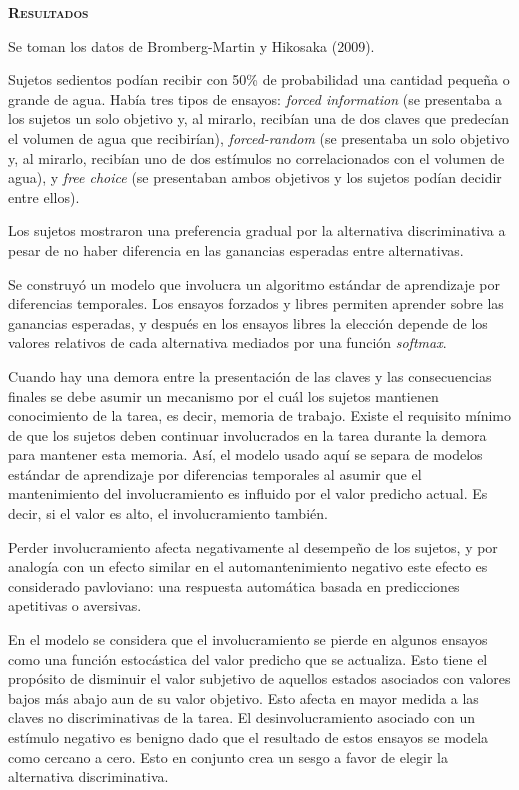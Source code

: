 \documentclass[a4paper,12pt]{article}
\begin{document}
{\scshape\bfseries Resultados}

Se toman los datos de Bromberg-Martin y Hikosaka (2009).

Sujetos sedientos podían recibir con 50\% de probabilidad una cantidad pequeña o grande de agua. Había tres tipos de ensayos: {\itshape forced information} (se presentaba a los sujetos un solo objetivo y, al mirarlo, recibían una de dos claves que predecían el volumen de agua que recibirían), {\itshape forced-random} (se presentaba un solo objetivo y, al mirarlo, recibían uno de dos estímulos no correlacionados con el volumen de agua), y {\itshape free choice} (se presentaban ambos objetivos y los sujetos podían decidir entre ellos). 

Los sujetos mostraron una preferencia gradual por la alternativa discriminativa a pesar de no haber diferencia en las ganancias esperadas entre alternativas. 

Se construyó un modelo que involucra un algoritmo estándar de aprendizaje por diferencias temporales. Los ensayos forzados y libres permiten aprender sobre las ganancias esperadas, y después en los ensayos libres la elección depende de los valores relativos de cada alternativa mediados por una función {\itshape softmax}. 

Cuando hay una demora entre la presentación de las claves y las consecuencias finales se debe asumir un mecanismo por el cuál los sujetos mantienen conocimiento de la tarea, es decir, memoria de trabajo. Existe el requisito mínimo de que los sujetos deben continuar involucrados en la tarea durante la demora para mantener esta memoria. Así, el modelo usado aquí se separa de modelos estándar de aprendizaje por diferencias temporales al asumir que el mantenimiento del involucramiento es influido por el valor predicho actual. Es decir, si el valor es alto, el involucramiento también.

Perder involucramiento afecta negativamente al desempeño de los sujetos, y por analogía con un efecto similar en el automantenimiento negativo este efecto es considerado pavloviano: una respuesta automática basada en predicciones apetitivas o aversivas. 

En el modelo se considera que el involucramiento se pierde en algunos ensayos como una función estocástica del valor predicho que se actualiza. Esto tiene el propósito de disminuir el valor subjetivo de aquellos estados asociados con valores bajos más abajo aun de su valor objetivo. Esto afecta en mayor medida a las claves no discriminativas de la tarea. El desinvolucramiento asociado con un estímulo negativo es benigno dado que el resultado de estos ensayos se modela como cercano a cero. Esto en conjunto crea un sesgo a favor de elegir la alternativa discriminativa.
\end{document}
